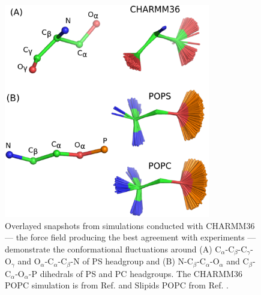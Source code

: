 \documentclass[aps,prl,superscriptaddress,twocolumn]{revtex4}
\begin{document}
\begin{figure}[]
  \centering
  \includegraphics[width=9.0cm]{../Figs/structures.eps}
  \caption{\label{HGstructuresPSandPC}
    Overlayed snapshots from simulations conducted with CHARMM36 --- the force field producing the best agreement with experiments ---
     demonstrate the conformational fluctuations around
    (A) C$_\alpha$-C$_\beta$-C$_\gamma$-O$_\gamma$ and  O$_\alpha$-C$_\alpha$-C$_\beta$-N
    of PS headgroup and (B) N-C$_\beta$-C$_\alpha$-O$_\alpha$ and C$_\beta$-C$_\alpha$-O$_\alpha$-P
    dihedrals of PS and PC headgroups.
    The CHARMM36 POPC simulation is from Ref.  and Slipids POPC from Ref. .
  }
\end{figure}
\end{document}
